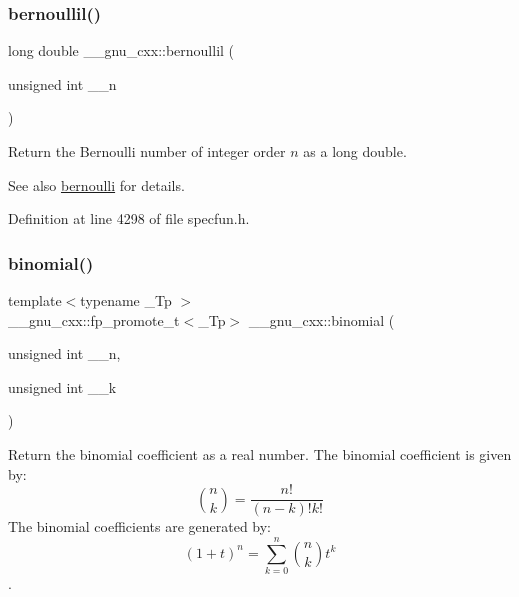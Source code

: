 \subsubsection{\texorpdfstring{bernoullil()}{bernoullil()}}
{\footnotesize\ttfamily long double \+\_\+\+\_\+gnu\+\_\+cxx\+::bernoullil (\begin{DoxyParamCaption}\item[{unsigned int}]{\+\_\+\+\_\+n }\end{DoxyParamCaption})\hspace{0.3cm}{\ttfamily [inline]}}

Return the Bernoulli number of integer order $ n $ as a {\ttfamily long double}.

\begin{DoxySeeAlso}{See also}
\hyperlink{group__gnu__math__spec__func_gad339f0011df1967ec6c9e55bd1547bf4}{bernoulli} for details. 
\end{DoxySeeAlso}


Definition at line 4298 of file specfun.\+h.

\mbox{\label{group__gnu__math__spec__func_gabd0cf6e3f1e1d36c4c45f118e34a5ca2}} 
\subsubsection{\texorpdfstring{binomial()}{binomial()}}
{\footnotesize\ttfamily template$<$typename \+\_\+\+Tp $>$ \\
\+\_\+\+\_\+gnu\+\_\+cxx\+::fp\+\_\+promote\+\_\+t$<$\+\_\+\+Tp$>$ \+\_\+\+\_\+gnu\+\_\+cxx\+::binomial (\begin{DoxyParamCaption}\item[{unsigned int}]{\+\_\+\+\_\+n,  }\item[{unsigned int}]{\+\_\+\+\_\+k }\end{DoxyParamCaption})\hspace{0.3cm}{\ttfamily [inline]}}



Return the binomial coefficient as a real number. The binomial coefficient is given by\+: \[ \binom{n}{k} = \frac{n!}{(n-k)! k!} \] The binomial coefficients are generated by\+: \[ \left(1 + t\right)^n = \sum_{k=0}^n \binom{n}{k} t^k \]. 



